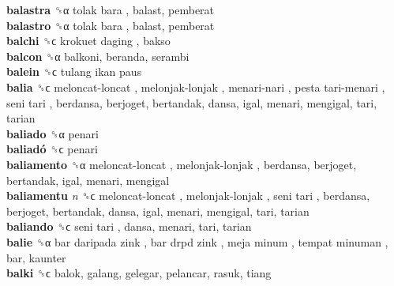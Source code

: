 \textbf{balastra} ␝α   tolak bara , balast, pemberat  \\
\textbf{balastro} ␝α   tolak bara , balast, pemberat  \\
\textbf{balchi} ␝ϲ   krokuet daging , bakso  \\
\textbf{balcon} ␝α  balkoni, beranda, serambi  \\
\textbf{balein} ␝ϲ   tulang ikan paus   \\
\textbf{balia} ␝ϲ   meloncat-loncat ,  melonjak-lonjak ,  menari-nari ,  pesta tari-menari ,  seni tari , berdansa, berjoget, bertandak, dansa, igal, menari, mengigal, tari, tarian  \\
\textbf{baliado} ␝α  penari  \\
\textbf{baliadó} ␝ϲ  penari  \\
\textbf{baliamento} ␝α   meloncat-loncat ,  melonjak-lonjak , berdansa, berjoget, bertandak, igal, menari, mengigal  \\
\textbf{baliamentu} \emph{n}  ␝ϲ   meloncat-loncat ,  melonjak-lonjak ,  seni tari , berdansa, berjoget, bertandak, dansa, igal, menari, mengigal, tari, tarian  \\
\textbf{baliando} ␝ϲ   seni tari , dansa, menari, tari, tarian  \\
\textbf{balie} ␝α   bar daripada zink ,  bar drpd zink ,  meja minum ,  tempat minuman , bar, kaunter  \\
\textbf{balki} ␝ϲ  balok, galang, gelegar, pelancar, rasuk, tiang  \\
